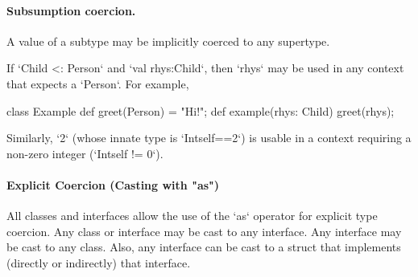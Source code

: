 \paragraph{Subsumption coercion.}
A value of a subtype may be implicitly coerced to any supertype.  

\begin{ex}
If \xcd`Child <: Person` and \xcd`val rhys:Child`, then \xcd`rhys` may be used
in any context that expects a \xcd`Person`.  For example, 
\begin{xten}
class Example {
  def greet(Person) = "Hi!";
  def example(rhys: Child) {
     greet(rhys);
  }
}
\end{xten}
%

Similarly, \xcd`2` (whose innate type is \xcd`Int{self==2}`)
is usable in a context requiring a non-zero integer
(\xcd`Int{self != 0}`).  
\end{ex}

\paragraph{Explicit Coercion (Casting with \xcd"as")}

All classes and interfaces allow the use of the \xcd`as` operator for explicit
type coercion.  
Any class or
interface may be cast to any interface.  
Any interface may be cast to
any class.  Also, any interface can be cast to a struct that implements
(directly or indirectly) that interface.

